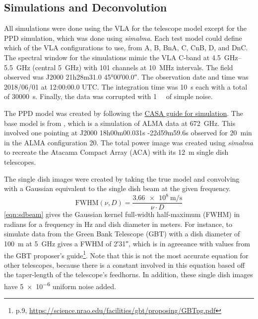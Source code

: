 \documentclass[manuscript,linenumbers]{aastex62}
\begin{document}
\subsection{Simulations and Deconvolution}
All simulations were done using the VLA for the telescope model except for the PPD simulation, which was done using \textit{simalma}. Each test model could define which of the VLA configurations to use, from A, B, BnA, C, CnB, D, and DnC. The spectral window for the simulations mimic the VLA C-band at \SIrange{4.5}{5.5}{\giga\hertz} (central \SI{5}{\giga\hertz}) with 101 channels at \SI{10}{\mega\hertz} intervals. The field observed was J2000 21h28m31.0 \ang{45;00;00.0}. The observation date and time was 2018/06/01 at 12:00:00.0 UTC. The integration time was \SI{10}{\second} each with a total of \SI{30000}{\second}. Finally, the data was corrupted with \SI{1}{\milli\jansky} of simple noise.

The PPD model was created by following the \href{https://casaguides.nrao.edu/index.php/Protoplanetary_Disk_Simulation_(CASA_5.1)}{CASA guide for simulation}. The base model is from \citet{2005ApJ...619.1114W}, which is a simulation of ALMA data at \SI{672}{\giga\hertz}. This involved one pointing at J2000 18h00m00.031s -22d59m59.6s observed for \SI{20}{\minute} in the ALMA configuration 20. The total power image was created using \textit{simalma} to recreate the Atacama Compact Array (ACA) with its \SI{12}{\meter} single dish telescopes. 

The single dish images were created by taking the true model and convolving with a Gaussian equivalent to the single dish beam at the given frequency. 
\begin{equation}
    \text{FWHM}(\nu, D) = \frac{\SI{3.66e8}{\meter\per\second}}{\nu \cdot D}
    \label{eqn:sdbeam}
\end{equation}
\autoref{eqn:sdbeam} gives the Gaussian kernel full-width half-maximum (FWHM) in radians for a frequency in Hz and dish diameter in meters. For instance, to simulate data from the Green Bank Telescope (GBT) with a dish diameter of \SI{100}{\meter} at \SI{5}{\giga\hertz} gives a FWHM of \ang{;2;31}, which is in agreeance with values from the GBT proposer's guide\footnote{p.9, \url{https://science.nrao.edu/facilities/gbt/proposing/GBTpg.pdf}}. Note that this is not the most accurate equation for other telescopes, because there is a constant involved in this equation based off the taper-length of the telescope's feedhorns. In addition, these single dish images have \num{5e-6} uniform noise added. 
\end{document}
